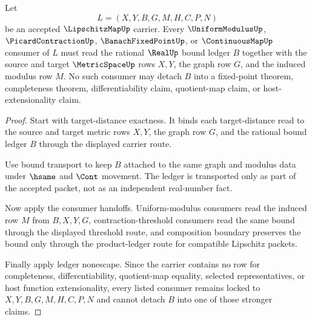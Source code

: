\begin{theorem}
\label{thm:lipschitz-map-bound-dependency-lock}
Let
$$
L=(X,Y,B,G,M,H,C,P,N)
$$
be an accepted $\LipschitzMapUp$ carrier. Every $\UniformModulusUp$, $\PicardContractionUp$, $\BanachFixedPointUp$, or $\ContinuousMapUp$ consumer of $L$ must read the rational $\RealUp$ bound ledger $B$ together with the source and target $\MetricSpaceUp$ rows $X,Y$, the graph row $G$, and the induced modulus row $M$. No such consumer may detach $B$ into a fixed-point theorem, completeness theorem, differentiability claim, quotient-map claim, or host-extensionality claim.
\end{theorem}
\begin{proof}
Start with target-distance exactness. It binds each target-distance read to the source and target metric rows $X,Y$, the graph row $G$, and the rational bound ledger $B$ through the displayed carrier route.

Use bound transport to keep $B$ attached to the same graph and modulus data under $\hsame$ and $\Cont$ movement. The ledger is transported only as part of the accepted packet, not as an independent real-number fact.

Now apply the consumer handoffs. Uniform-modulus consumers read the induced row $M$ from $B,X,Y,G$, contraction-threshold consumers read the same bound through the displayed threshold route, and composition boundary preserves the bound only through the product-ledger route for compatible Lipschitz packets.

Finally apply ledger nonescape. Since the carrier contains no row for completeness, differentiability, quotient-map equality, selected representatives, or host function extensionality, every listed consumer remains locked to $X,Y,B,G,M,H,C,P,N$ and cannot detach $B$ into one of those stronger claims.
\end{proof}


